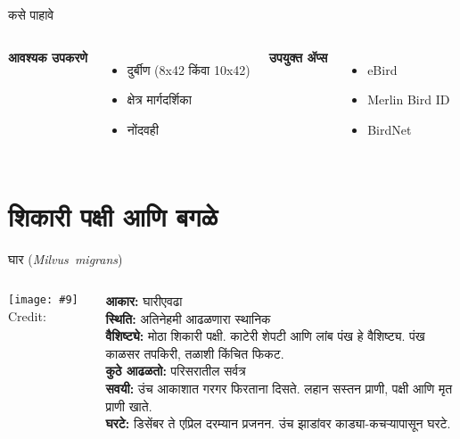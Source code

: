 \documentclass[aspectratio=169]{beamer}
\newcommand{\imagecredit}[1]{%
  \def\stripext##1.jpg{##1}%
  \edef\creditfile{\stripext#1_credit.txt}%
  {\scriptsize\latintext Credit: }%
}
\newcommand{\sciname}[1]{\mbox{\latintext\textit{#1}}}
\begin{document}
\begin{frame}{कसे पाहावे}
    \begin{columns}[T]
        \textbf{आवश्यक उपकरणे}
        \begin{itemize}
            \item दुर्बीण ({\latintext 8x42} किंवा {\latintext 10x42})
            \item क्षेत्र मार्गदर्शिका
            \item नोंदवही
        \end{itemize}
        \textbf{उपयुक्त ॲप्स}
        \begin{itemize}
            \item {\latintext eBird}
            \item {\latintext Merlin Bird ID}
            \item {\latintext BirdNet}
        \end{itemize}
    \end{columns}
\end{frame}

\newcommand{\birdslide}[9]{%
\begin{frame}{#1 (\sciname{#2})}
    \begin{columns}[T]
        \column{0.5\textwidth}
        \texttt{[image: \#9]}
        \imagecredit{#9}
        \column{0.5\textwidth}
        \textbf{आकार:} #3 \\
        \textbf{स्थिति:} #4 \\[0.5em]
        \textbf{वैशिष्ट्ये:} #5 \\[0.5em]
        \textbf{कुठे आढळतो:} #6 \\[0.5em]
        \textbf{सवयी:} #7 \\[0.5em]
        \textbf{घरटे:} #8
    \end{columns}
\end{frame}
}

\section{शिकारी पक्षी आणि बगळे}
\birdslide{घार}{Milvus migrans}
{घारीएवढा}
{अतिनेहमी आढळणारा स्थानिक}
{मोठा शिकारी पक्षी. काटेरी शेपटी आणि लांब पंख हे वैशिष्ट्य. पंख काळसर तपकिरी, तळाशी किंचित फिकट.}
{परिसरातील सर्वत्र}
{उंच आकाशात गरगर फिरताना दिसते. लहान सस्तन प्राणी, पक्षी आणि मृत प्राणी खाते.}
{डिसेंबर ते एप्रिल दरम्यान प्रजनन. उंच झाडांवर काड्या-कचऱ्यापासून घरटे.}
{black-kite.jpg}
\end{document}
